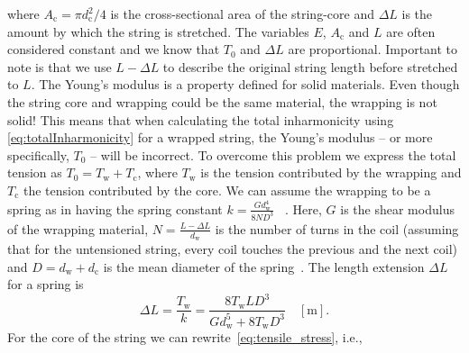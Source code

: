 \documentclass{article}
\begin{document}
\begin{sloppy}
\begin{equation}
\end{equation}
%
where $A_\text{c} = \pi d_\text{c}^2/4$ is the cross-sectional area of the string-core and $\Delta L$ is the amount by which the string is stretched. The variables $E$, $A_\text{c}$ and $L$ are often considered constant and we know that $T_0$ and $\Delta L$ are proportional. Important to note is that we use $L - \Delta L$ to describe the original string length before stretched to $L$. The Young's modulus is a property defined for solid materials. Even though the string core and wrapping could be the same material, the wrapping is not solid! This means that when calculating the total inharmonicity using \eqref{eq:totalInharmonicity} for a wrapped string, the Young's modulus -- or more specifically, $T_0$ -- will be incorrect. %
To overcome this problem we express the total tension as
$    T_0 = T_\text{w} + T_\text{c}$,
where $T_\text{w}$ is the tension contributed by the wrapping and $T_\text{c}$ the tension contributed by the core. %
%
We can assume the wrapping to be a spring as in \cite{kemp:wound_and_unwound_strings} having the spring constant 
%
   $k = \frac{Gd_\text{w}^4}{8ND^3}$ %
%
~\cite{childs:mechanical_engineering}. %
Here, $G$ is the shear modulus of the wrapping material, $N = \frac{L - \Delta L}{d_\text{w}}$ is the number of turns in the coil (assuming that for the untensioned string, every coil touches the previous and the next coil) and $D = d_\text{w}+d_\text{c}$ is the mean diameter of the spring~\cite{kemp:wound_and_unwound_strings}.
%
The length extension $\Delta L$ for a spring is
%
\begin{equation}\label{eq:deltaL_wrapping}
    \Delta L = \frac{T_\text{w}}{k} = \frac{8T_\text{w}LD^3}{Gd_\text{w}^5 + 8T_\text{w}D^3} \quad [\text{m}].
\end{equation}
%
For the core of the string we can rewrite~\eqref{eq:tensile_stress}, i.e.,

\end{sloppy}
\end{document}
